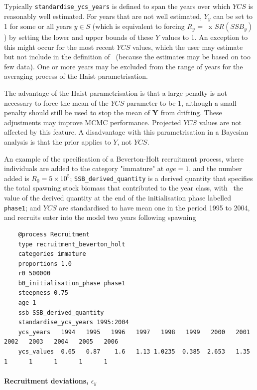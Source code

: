 Typically \texttt{standardise\_ycs\_years} is defined to span the years over which $YCS$ is reasonably well estimated. For years that are not well estimated, $Y_y$ can be set to 1 for some or all years $y\in S$ (which is equivalent to forcing $R_y$ = \Rzero\ x $SR(SSB_y)$) by setting the lower and upper bounds of these $Y$ values to 1. An exception to this might occur for the most recent $YCS$ values, which the user may estimate but not include in the definition of \Rzero\ (because the estimates may be based on too few data). One or more years may be excluded from the range of years for the averaging process of the Haist parametrisation.

The advantage of the Haist parametrisation is that a large penalty is not necessary to force the mean of the $YCS$ parameter to be 1, although a small penalty should still be used to stop the mean of \textbf{Y} from drifting. These adjustments may improve MCMC performance. Projected $YCS$ values are not affected by this feature. A disadvantage with this parametrisation in a Bayesian analysis is that the prior applies to $Y$, not $YCS$.

An example of the specification of a Beverton-Holt recruitment process, where individuals are added to the category "immature" at $age=1$, and the number added is $R_0=5 \times 10^5$; \texttt{SSB\_derived\_quantity} is a derived quantity that specifies the total spawning stock biomass that contributed to the year class, with \Bzero\ the value of the derived quantity at the end of the initialisation phase labelled \texttt{phase1}; and $YCS$ are standardised to have mean one in the period 1995 to 2004, and recruits enter into the model two years following spawning

{\small{\begin{verbatim}
	@process Recruitment
	type recruitment_beverton_holt
	categories immature
	proportions 1.0
	r0 500000
	b0_initialisation_phase phase1
	steepness 0.75
	age 1
	ssb SSB_derived_quantity
	standardise_ycs_years 1995:2004
	ycs_years   1994   1995   1996   1997   1998   1999   2000   2001   2002   2003   2004   2005   2006
	ycs_values  0.65   0.87    1.6   1.13 1.0235  0.385  2.653   1.35      1      1      1      1      1
\end{verbatim}}}


\paragraph*{Recruitment deviations, $\epsilon_y$}


